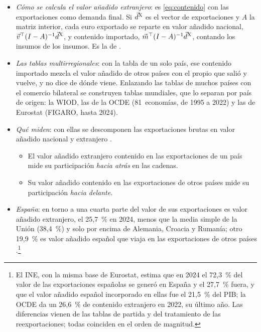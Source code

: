 \documentclass[11pt]{article}
\begin{document}
\begin{itemize}
\item \emph{Cómo se calcula el valor añadido extranjero}: es \eqref{eq:contenido} con las exportaciones como demanda final. Si $\vec{d}^{\mathrm X}$ es el vector de exportaciones y $A$ la matriz interior, cada euro exportado se reparte en valor añadido nacional, $\vec{v}^{\top}(I-A)^{-1}\vec{d}^{\mathrm X}$, y contenido importado, $\vec{m}^{\top}(I-A)^{-1}\vec{d}^{\mathrm X}$, contando los insumos de los insumos. Es la  de \textcite{HummelsIshiiYi2001}.
\item \emph{Las tablas multirregionales}: con la tabla de un solo país, ese contenido importado mezcla el valor añadido de otros países con el propio que salió y vuelve, y no dice de dónde viene. Enlazando las tablas de muchos países con el comercio bilateral se construyen tablas mundiales, que lo separan por país de origen: la WIOD\nocite{Timmer2015WIOD}, las de la OCDE (81~economías, de 1995 a 2022) y las de Eurostat (FIGARO, hasta 2024)\nocite{OCDE2025TiVA,Eurostat2026FIGARO}.
\item \emph{Qué miden}: con ellas se descomponen las exportaciones brutas en valor añadido nacional y extranjero\nocite{JohnsonNoguera2012,KoopmanWangWei2014} .
  \begin{itemize}
  \item El valor añadido extranjero contenido en las exportaciones de un país mide su participación \emph{hacia atrás} en las cadenas.
  \item Su valor añadido contenido en las exportaciones de otros países mide su participación \emph{hacia delante}.
  \end{itemize}
\item \emph{España}: en torno a una cuarta parte del valor de sus exportaciones es valor añadido extranjero, el 25,7~\% en 2024, menos que la media simple de la Unión (38,4~\%) y solo por encima de Alemania, Croacia y Rumanía; otro 19,9~\% es valor añadido español que viaja en las exportaciones de otros países\nocite{Eurostat2026FIGAROcgv}  .\footnote{El INE, con la misma base de Eurostat, estima que en 2024 el 72,3~\% del valor de las exportaciones españolas se generó en España y el 27,7~\% fuera, y que el valor añadido español incorporado en ellas fue el 21,5~\% del PIB\nocite{INE2026TiVA2024}; la OCDE da un 26,6~\% de contenido extranjero en 2022, su último año\nocite{OCDE2025TiVA}. Las diferencias vienen de las tablas de partida y del tratamiento de las reexportaciones; todas coinciden en el orden de magnitud.}
\end{itemize}
\end{document}
